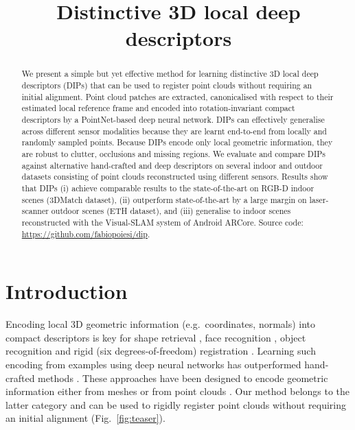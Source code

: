 \documentclass[a4paper,conference]{IEEEtran}
\begin{document}
\title{Distinctive 3D local deep descriptors}

\author{
}

\maketitle

\begin{abstract}
We present a simple but yet effective method for learning distinctive 3D local deep descriptors (DIPs) that can be used to register point clouds without requiring an initial alignment.
Point cloud patches are extracted, canonicalised with respect to their estimated local reference frame and encoded into rotation-invariant compact descriptors by a PointNet-based deep neural network.
DIPs can effectively generalise across different sensor modalities because they are learnt end-to-end from locally and randomly sampled points.
Because DIPs encode only local geometric information, they are robust to clutter, occlusions and missing regions.
We evaluate and compare DIPs against alternative hand-crafted and deep descriptors on several indoor and outdoor datasets consisting of point clouds reconstructed using different sensors.
Results show that DIPs (i) achieve comparable results to the state-of-the-art on RGB-D indoor scenes (3DMatch dataset), (ii) outperform state-of-the-art by a large margin on laser-scanner outdoor scenes (ETH dataset), and (iii) generalise to indoor scenes reconstructed with the Visual-SLAM system of Android ARCore.
Source code: \url{https://github.com/fabiopoiesi/dip}.
\end{abstract} 
\IEEEpeerreviewmaketitle

\section{Introduction}

Encoding local 3D geometric information (e.g.~coordinates, normals) into compact descriptors is key for shape retrieval \cite{Ovsjanikov2010}, face recognition \cite{Lei2016}, object recognition \cite{Johnson1999} and rigid (six degrees-of-freedom) registration \cite{Zeng2017}.
Learning such encoding from examples using deep neural networks has outperformed hand-crafted methods \cite{Zeng2017,Yang2017,Deng2018cvpr,Deng2018eccv,Deng2019,Zhao2019,Gojcic2019,Choy2019,Bai2020}.
These approaches have been designed to encode geometric information either from meshes \cite{Boscaini2016,Monti2017} or from point clouds \cite{Gojcic2019,Choy2019,Bai2020}.
Our method belongs to the latter category and can be used to rigidly register point clouds without requiring an initial alignment (Fig.~\ref{fig:teaser}).
\end{document}
